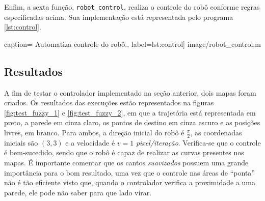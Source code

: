 	\vspace{12pt}
	
	Enfim, a sexta função, \texttt{robot\_control}, realiza o controle do robô
	conforme regras especificadas acima. Sua implementação está representada pelo
	programa \ref{lst:control}.
	
	 caption={  
	Automatiza controle do robô.}, label={lst:control}] {image/robot_control.m}  
	
	\subsection {Resultados}
	
	A fim de testar o controlador implementado na seção anterior, dois mapas foram
	criados. Os resultados das execuções estão representados na figuras
	\ref{fig:test_fuzzy_1} e \ref{fig:test_fuzzy_2}, em que a trajetória está
	representada em preto, a parede em cinza claro, os pontos de destino em cinza
	escuro e as posições livres, em branco. Para ambos, a direção inicial do robô é
	\(\frac{\pi}{2}\), as coordenadas iniciais são \((3,3)\) e a velocidade é \(v =
	1 \) \textit{pixel/iteração}. Verifica-se que o controle é bem-sucedido, sendo
	que o robô é capaz de realizar as curvas presentes nos mapas. É importante
	comentar que os cantos \textit{suavizados} possuem uma grande importância para o
	bom resultado, uma vez que o controle nas áreas de ``ponta'' não é tão eficiente
	visto que, quando o controlador verifica a proximidade a uma parede, ele pode
	não saber para que lado virar.
		
	\FloatBarrier
			    
